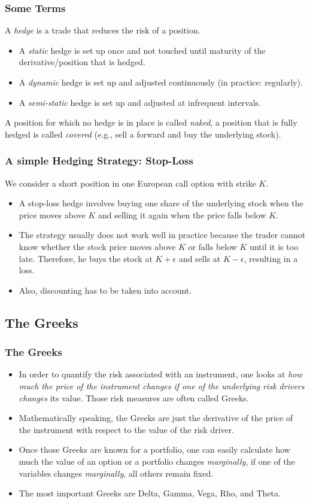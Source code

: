 \begin{frame}[fragile]
\frametitle{Some Terms}
A \emph{hedge} is a trade that reduces the risk of a position.
\begin{itemize}
  \item A \emph{static} hedge is set up once and not touched until maturity of
  the derivative/position that is hedged.
  \item A \emph{dynamic} hedge is set up and adjusted continuously (in practice:
  regularly).
  \item A \emph{semi-static} hedge is set up and adjusted at infrequent
  intervals.
\end{itemize}
A position for which no hedge is in place is called \emph{naked}, a position
that is fully hedged is called \emph{covered} (e.g., sell a forward and buy the
underlying stock).
\end{frame}

\begin{frame}[fragile]
\frametitle{A simple Hedging Strategy: Stop-Loss}
We consider a short position in one European call option with strike $K$. 
\begin{itemize}
  \item A stop-loss hedge involves buying one share of the underlying stock when
  the price moves above $K$ and selling it again when the price falls below $K$.
  \item The strategy usually does not work well in practice because the trader
  cannot know whether the stock price moves above $K$ or falls below $K$ until
  it is too late. Therefore, he buys the stock at $K+\epsilon$ and sells at
  $K-\epsilon$, resulting in a loss.
  \item Also, discounting has to be taken into account.
\end{itemize}
\end{frame}

\subsection{The Greeks}
\begin{frame}[fragile]
\frametitle{The Greeks}
\begin{itemize}
\item In order to quantify the risk associated with an instrument, one looks at
\emph{ how much the price of the instrument changes if one of the underlying
risk drivers changes} its value. Those risk measures are often called
Greeks.
\item Mathematically speaking, the Greeks are just the derivative of the price
of the instrument with respect to the value of the risk driver.
\item Once those Greeks are known for a portfolio, one can easily calculate how
much the value of an option or a portfolio changes \emph{marginally}, if one of
the variables changes \emph{marginally}, all others remain fixed.
\item The most important Greeks are Delta, Gamma, Vega, Rho, and Theta.
\end{itemize}
\end{frame}

